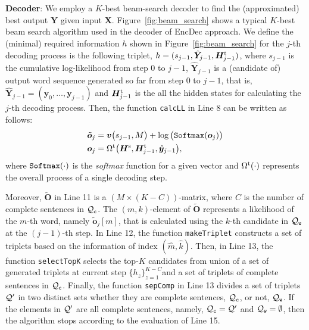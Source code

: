 \documentclass[11pt]{article}
\begin{document}
%
   {\bf Decoder}:
   We employ a $K$-best beam-search decoder to find the (approximated) best output $\hat{\bm{Y}}$ given input $\bm{X}$.
   Figure~\ref{fig:beam_search} shows a typical $K$-best beam search algorithm used in the decoder of EncDec approach. 
   We define the (minimal) required information $h$ shown in Figure~\ref{fig:beam_search} for the $j$-th decoding process is the following triplet, $h=(s_{j-1}, \hat{\bm{Y}}_{j-1},  \bm{H}^{\rm t}_{j-1})$, where
   $s_{j-1}$ is the cumulative log-likelihood from step 0 to $j-1$,
   $\hat{\bm{Y}}_{j-1}$ is a (candidate of) output word sequence generated so far from step 0 to $j-1$, that is, $\hat{\bm{Y}}_{j-1}=(\bm{y}_0, \dots, \bm{y}_{j-1})$
   and
   $\bm{H}^{\rm t}_{j-1}$ is the all the hidden states for calculating the $j$-th decoding process.
   Then, the function {\tt calcLL} in Line 8 can be written as follows:
\begin{align}
 \displaystyle
 \tilde{\bm{o}}_j
 &= \displaystyle
 \bm{v}\big(s_{j-1}, {M}\big)
 +
 \log
 \big(
 {\tt Softmax} ( \bm{o}_{j} )
 \big)
 \nonumber\\
 \displaystyle
 \bm{o}_j
 &=
 \Omega^{\rm t}
 \big(
 \bm{H}^{\rm s}, \bm{H}^{{\rm t}}_{j-1}, \hat{\bm{y}}_{j-1}
 \big)
 ,
 \label{eq:calc_output_score}
\end{align}
%
   where ${\tt Softmax}(\cdot)$ is the {\it softmax} function for a given vector
   and $\Omega^{\rm t}(\cdot)$ represents the overall process of a single decoding step. 

   Moreover, $\tilde{\bm{O}}$ in Line 11 is a $({M\times (K-C)})$-matrix, where $C$ is the number of complete sentences in ${\cal Q}_{\tt c}$.
   The $(m,k)$-element of $\tilde{\bm{O}}$ represents a likelihood of the $m$-th word, namely $\tilde{\bm{o}}_j[m]$, that is calculated using the $k$-th candidate in ${\cal Q}_{\tt w}$ at the $(j-1)$-th step.
   In Line 12, the function {\tt makeTriplet} constructs a set of triplets based on the information of index $(\hat{m},\hat{k})$.
   Then, in Line 13, the function {\tt selectTopK} selects the top-$K$ candidates from union of a set of generated triplets at current step $\{h_{z}\}^{K-C}_{z=1}$and a set of triplets of complete sentences in ${\cal Q}_{\tt c}$.
   Finally, the function {\tt sepComp} in Line 13 divides a set of triplets ${\cal Q}'$ in two distinct sets whether they are complete sentences, ${\cal Q}_{\tt c}$, or not, ${\cal Q}_{\tt w}$.
   If the elements in ${\cal Q}'$ are all complete sentences, namely, ${\cal Q}_{\tt c} = {\cal Q}'$ and ${\cal Q}_{\tt w}=\emptyset$, then the algorithm stops according to the evaluation of Line 15.
\end{document}

